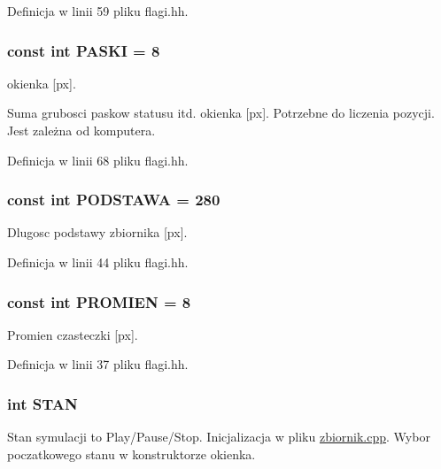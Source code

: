 Definicja w linii 59 pliku flagi.\-hh.

\hypertarget{flagi_8hh_afa380d01dc08ee237b4eea9046704397}{
\subsubsection[{P\-A\-S\-K\-I}]{\setlength{\rightskip}{0pt plus 5cm}const int P\-A\-S\-K\-I = 8}}\label{flagi_8hh_afa380d01dc08ee237b4eea9046704397}
okienka \mbox{[}px\mbox{]}.

Suma grubosci paskow statusu itd. okienka \mbox{[}px\mbox{]}. Potrzebne do liczenia pozycji. Jest zależna od komputera. 

Definicja w linii 68 pliku flagi.\-hh.

\hypertarget{flagi_8hh_acd3c5814c051e565bf7854f6403acf49}{
\subsubsection[{P\-O\-D\-S\-T\-A\-W\-A}]{\setlength{\rightskip}{0pt plus 5cm}const int P\-O\-D\-S\-T\-A\-W\-A = 280}}\label{flagi_8hh_acd3c5814c051e565bf7854f6403acf49}
Dlugosc podstawy zbiornika \mbox{[}px\mbox{]}. 

Definicja w linii 44 pliku flagi.\-hh.

\hypertarget{flagi_8hh_aa77f856f3142a9e81752665a9bc2e6de}{
\subsubsection[{P\-R\-O\-M\-I\-E\-N}]{\setlength{\rightskip}{0pt plus 5cm}const int P\-R\-O\-M\-I\-E\-N = 8}}\label{flagi_8hh_aa77f856f3142a9e81752665a9bc2e6de}
Promien czasteczki \mbox{[}px\mbox{]}. 

Definicja w linii 37 pliku flagi.\-hh.

\hypertarget{flagi_8hh_ae3a120c63186a17e4127a68187b3e9e8}{
\subsubsection[{S\-T\-A\-N}]{\setlength{\rightskip}{0pt plus 5cm}int S\-T\-A\-N}}\label{flagi_8hh_ae3a120c63186a17e4127a68187b3e9e8}
Stan symulacji to Play/\-Pause/\-Stop. Inicjalizacja w pliku \hyperlink{zbiornik_8cpp}{zbiornik.\-cpp}. Wybor poczatkowego stanu w konstruktorze okienka.

